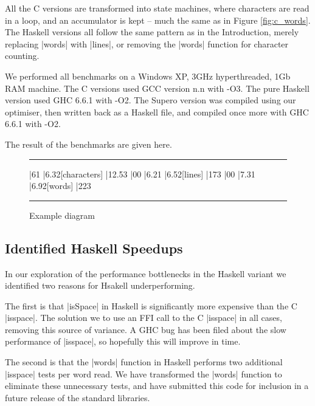 \documentclass{llncs}
\newenvironment{fig}
    {\begin{figure}[tbp]\hrule}
    {\end{figure}}
\newcommand{\figend}{\hrule}
\begin{document}
All the C versions are transformed into state machines, where characters are read in a loop, and an accumulator is kept -- much the same as in Figure \ref{fig:c_words}. The Haskell versions all follow the same pattern as in the Introduction, merely replacing |words| with |lines|, or removing the |words| function for character counting.

We performed all benchmarks on a Windows XP, 3GHz hyperthreaded, 1Gb RAM machine. The C versions used GCC version n.n with -O3. The pure Haskell version used GHC 6.6.1 with -O2. The Supero version was compiled using our optimiser, then written back as a Haskell file, and compiled once more with GHC 6.6.1 with -O2.

The result of the benchmarks are given here.

\begin{fig}
\begin{barenv}
 
\bar{6}{1}
\bar{6.3}{2}[characters]
\bar{12.5}{3}
\bar{0}{0}
\bar{6.2}{1}
\bar{6.5}{2}[lines]
\bar{17}{3}
\bar{0}{0}
\bar{7.3}{1}
\bar{6.9}{2}[words]
\bar{22}{3}
\end{barenv}
\vspace{0.5cm}
\begin{barenv}
\end{barenv}
\figend
\caption{Example diagram}
\label{fig:c_results}
\end{fig}

\subsection{Identified Haskell Speedups}

In our exploration of the performance bottlenecks in the Haskell variant we identified two reasons for Hsakell underperforming.

The first is that |isSpace| in Haskell is significantly more expensive than the C |isspace|. The solution we to use an FFI call to the C |isspace| in all cases, removing this source of variance. A GHC bug has been filed about the slow performance of |isspace|, so hopefully this will improve in time.

The second is that the |words| function in Haskell performs two additional |isspace| tests per word read. We have transformed the |words| function to eliminate these unnecessary tests, and have submitted this code for inclusion in a future release of the standard libraries.
\end{document}
